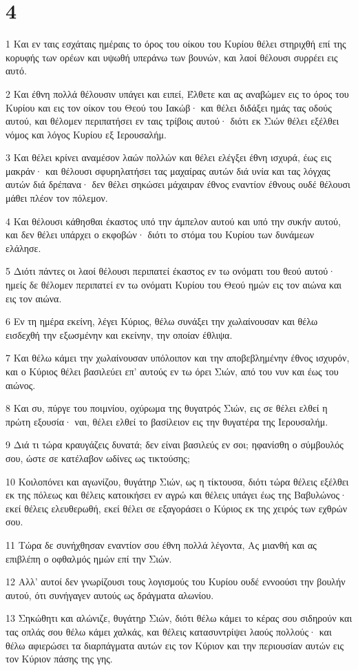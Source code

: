 \chapter{4}

\par 1 Και εν ταις εσχάταις ημέραις το όρος του οίκου του Κυρίου θέλει στηριχθή επί της κορυφής των ορέων και υψωθή υπεράνω των βουνών, και λαοί θέλουσι συρρέει εις αυτό.
\par 2 Και έθνη πολλά θέλουσιν υπάγει και ειπεί, Έλθετε και ας αναβώμεν εις το όρος του Κυρίου και εις τον οίκον του Θεού του Ιακώβ· και θέλει διδάξει ημάς τας οδούς αυτού, και θέλομεν περιπατήσει εν ταις τρίβοις αυτού· διότι εκ Σιών θέλει εξέλθει νόμος και λόγος Κυρίου εξ Ιερουσαλήμ.
\par 3 Και θέλει κρίνει αναμέσον λαών πολλών και θέλει ελέγξει έθνη ισχυρά, έως εις μακράν· και θέλουσι σφυρηλατήσει τας μαχαίρας αυτών διά υνία και τας λόγχας αυτών διά δρέπανα· δεν θέλει σηκώσει μάχαιραν έθνος εναντίον έθνους ουδέ θέλουσι μάθει πλέον τον πόλεμον.
\par 4 Και θέλουσι κάθησθαι έκαστος υπό την άμπελον αυτού και υπό την συκήν αυτού, και δεν θέλει υπάρχει ο εκφοβών· διότι το στόμα του Κυρίου των δυνάμεων ελάλησε.
\par 5 Διότι πάντες οι λαοί θέλουσι περιπατεί έκαστος εν τω ονόματι του θεού αυτού· ημείς δε θέλομεν περιπατεί εν τω ονόματι Κυρίου του Θεού ημών εις τον αιώνα και εις τον αιώνα.
\par 6 Εν τη ημέρα εκείνη, λέγει Κύριος, θέλω συνάξει την χωλαίνουσαν και θέλω εισδεχθή την εξωσμένην και εκείνην, την οποίαν έθλιψα.
\par 7 Και θέλω κάμει την χωλαίνουσαν υπόλοιπον και την αποβεβλημένην έθνος ισχυρόν, και ο Κύριος θέλει βασιλεύει επ' αυτούς εν τω όρει Σιών, από του νυν και έως του αιώνος.
\par 8 Και συ, πύργε του ποιμνίου, οχύρωμα της θυγατρός Σιών, εις σε θέλει ελθεί η πρώτη εξουσία· ναι, θέλει ελθεί το βασίλειον εις την θυγατέρα της Ιερουσαλήμ.
\par 9 Διά τι τώρα κραυγάζεις δυνατά; δεν είναι βασιλεύς εν σοι; ηφανίσθη ο σύμβουλός σου, ώστε σε κατέλαβον ωδίνες ως τικτούσης;
\par 10 Κοιλοπόνει και αγωνίζου, θυγάτηρ Σιών, ως η τίκτουσα, διότι τώρα θέλεις εξέλθει εκ της πόλεως και θέλεις κατοικήσει εν αγρώ και θέλεις υπάγει έως της Βαβυλώνος· εκεί θέλεις ελευθερωθή, εκεί θέλει σε εξαγοράσει ο Κύριος εκ της χειρός των εχθρών σου.
\par 11 Τώρα δε συνήχθησαν εναντίον σου έθνη πολλά λέγοντα, Ας μιανθή και ας επιβλέπη ο οφθαλμός ημών επί την Σιών.
\par 12 Αλλ' αυτοί δεν γνωρίζουσι τους λογισμούς του Κυρίου ουδέ εννοούσι την βουλήν αυτού, ότι συνήγαγεν αυτούς ως δράγματα αλωνίου.
\par 13 Σηκώθητι και αλώνιζε, θυγάτηρ Σιών, διότι θέλω κάμει το κέρας σου σιδηρούν και τας οπλάς σου θέλω κάμει χαλκάς, και θέλεις κατασυντρίψει λαούς πολλούς· και θέλω αφιερώσει τα διαρπάγματα αυτών εις τον Κύριον και την περιουσίαν αυτών εις τον Κύριον πάσης της γης.

